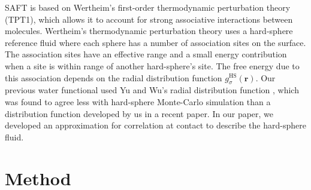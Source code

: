 \documentclass[twocolumn,amsmath,amssymb,prl]{revtex4-1}
\newcommand{\rr}{\textbf{r}}
\begin{document}
SAFT is based on Wertheim's first-order thermodynamic perturbation
theory (TPT1)\cite{wertheim1984fluidsI, wertheim1984fluidsII,
  wertheim1986fluidsIII, wertheim1986fluidsIV}, which allows it to
account for strong associative interactions between
molecules. Wertheim's thermodynamic perturbation theory uses a
hard-sphere reference fluid where each sphere has a number of
association sites on the surface. The association sites have an
effective range and a small energy contribution when a site is within
range of another hard-sphere's site. The free energy due to this
association depends on the radial distribution function
$g_\sigma^\text{HS}(\rr)$. Our previous water functional used Yu and
Wu's radial distribution function
\cite{yu2002fmt-dft-inhomogeneous-associating}, which was found to
agree less with hard-sphere Monte-Carlo simulation than a distribution
function developed by us in a recent paper.\cite{schulte2012using} In
our paper, we developed an approximation for correlation at
contact to describe the hard-sphere fluid.

\section{Method}
\end{document}
